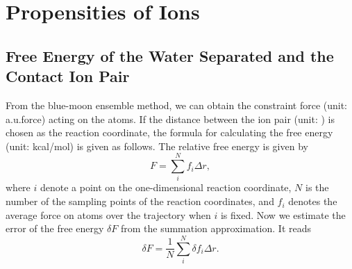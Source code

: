 \chapter{Propensities of Ions}\label{propensities_of_ions} 
\section{Free Energy of the Water Separated and the Contact Ion Pair}\label{calculate_free_energy} 
From the blue-moon ensemble method\cite{Carter1989,Sprik1998}, we can obtain the constraint force (unit: a.u.force) acting on the atoms. 
If the distance between the ion pair (unit: \A) is chosen as the reaction coordinate, the formula for calculating the free energy (unit: kcal/mol) is given as follows.
The relative free energy is given by
\begin{equation}
  F = \sum_{i}^{N}f_i{\Delta{r}},\nonumber
  \label{eq:f-e}
\end{equation}
where $i$ denote a point on the one-dimensional reaction coordinate, 
$N$ is the number of the sampling points of the reaction coordinates,
and $f_i$ denotes the average force on atoms over the trajectory when $i$ is fixed. 
Now we estimate the error of the free energy $\delta{F}$ from the summation approximation. It reads
\begin{equation}
  \delta{F} = \frac{1}{N}\sum_{i}^{N}\delta{f_i}{\Delta{r}}.
  \label{eq:dleta_f}
\end{equation}
